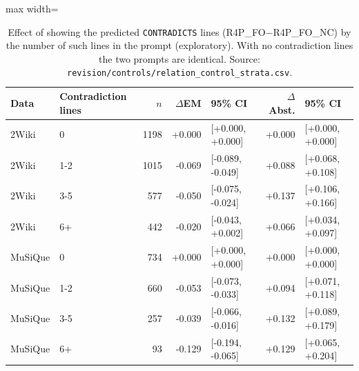 \begin{table}[t]
\centering
\footnotesize
\begin{adjustbox}{max width=\linewidth}
\begin{tabular}{@{}llrrlrl@{}}
\toprule
Data & Contradiction lines & $n$ & $\Delta$EM & 95\% CI & $\Delta$Abst. & 95\% CI \\
\midrule
2Wiki & 0 & 1198 & +0.000 & [+0.000, +0.000] & +0.000 & [+0.000, +0.000] \\
2Wiki & 1-2 & 1015 & -0.069 & [-0.089, -0.049] & +0.088 & [+0.068, +0.108] \\
2Wiki & 3-5 & 577 & -0.050 & [-0.075, -0.024] & +0.137 & [+0.106, +0.166] \\
2Wiki & 6+ & 442 & -0.020 & [-0.043, +0.002] & +0.066 & [+0.034, +0.097] \\
\midrule
MuSiQue & 0 & 734 & +0.000 & [+0.000, +0.000] & +0.000 & [+0.000, +0.000] \\
MuSiQue & 1-2 & 660 & -0.053 & [-0.073, -0.033] & +0.094 & [+0.071, +0.118] \\
MuSiQue & 3-5 & 257 & -0.039 & [-0.066, -0.016] & +0.132 & [+0.089, +0.179] \\
MuSiQue & 6+ & 93 & -0.129 & [-0.194, -0.065] & +0.129 & [+0.065, +0.204] \\
\bottomrule
\end{tabular}
\end{adjustbox}
\caption{Effect of showing the predicted \texttt{CONTRADICTS} lines (R4P\_FO$-$R4P\_FO\_NC) by the number of such lines in the prompt (exploratory). With no contradiction lines the two prompts are identical. Source: \texttt{revision/\allowbreak controls/\allowbreak relation\_control\_strata.csv}.}
\label{tab:controls-strata}
\end{table}

